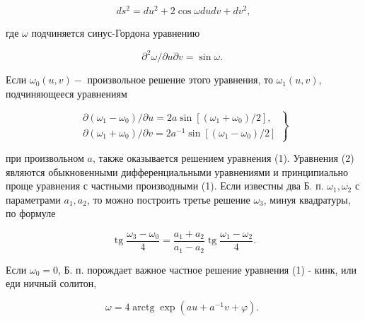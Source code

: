 \documentclass[10pt]{article}
\begin{document}
\[

d s^{2}=d u^{2}+2 \cos \omega d u d v+d v^{2},

\]



где $\omega$ подчиняется синус-Гордона уравнению



\[

\partial^{2} \omega / \partial u \partial v=\sin \omega \text {. }

\]



Если $\omega_{0}(u, v)-$ произвольное решение этого уравнения, то $\omega_{1}(u, v)$, подчиняющееся уравнениям



\[

\left.\begin{array}{l}

\partial\left(\omega_{1}-\omega_{0}\right) / \partial u=2 a \sin \left[\left(\omega_{1}+\omega_{0}\right) / 2\right], \\

\partial\left(\omega_{1}+\omega_{0}\right) / \partial v=2 a^{-1} \sin \left[\left(\omega_{1}-\omega_{0}\right) / 2\right]

\end{array}\right\}

\]



при произвольном $a$, также оказывается решением уравнения (1). Уравнения (2) являются обыкновенными дифференциальными уравнениями и принципиально проще уравнения с частными производными (1). Если известны два Б. п. $\omega_{1}, \omega_{2}$ с параметрами $a_{1}, a_{2}$, то можно построить третье решение $\omega_{3}$, минуя квадратуры, по формуле



\[

\operatorname{tg} \frac{\omega_{3}-\omega_{0}}{4}=\frac{a_{1}+a_{2}}{a_{1}-a_{2}} \operatorname{tg} \frac{\omega_{1}-\omega_{2}}{4} .

\]



Если $\omega_{0}=0$, Б. п. порождает важное частное решение уравнения (1) - кинк, или еди ничный солитон,



\[

\omega=4 \operatorname{arctg} \exp \left(a u+a^{-1} v+\varphi\right) \text {. }

\]
\end{document}
